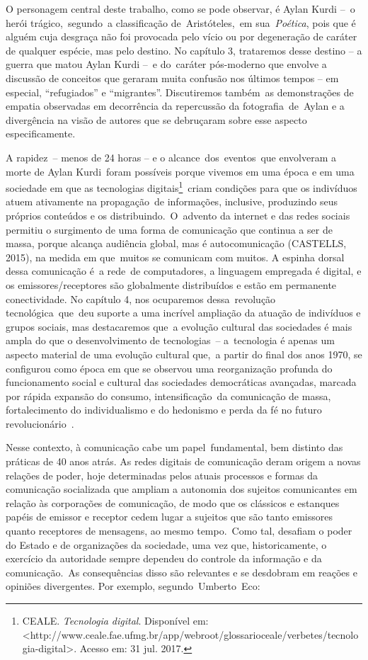 \documentclass[
  letterpaper,
  a4paper,
  12pt]{scrbook}
\begin{document}
O personagem central deste trabalho, como se pode observar, é Aylan
Kurdi --~o herói trágico,~segundo~a classificação de~Aristóteles,~em
sua~\emph{Poética}, pois que é alguém cuja desgraça não foi provocada
pelo vício ou por degeneração de caráter de qualquer espécie, mas pelo
destino. No capítulo 3, trataremos desse destino -- a guerra que matou
Aylan Kurdi --~e do~caráter pós-moderno que envolve a discussão de
conceitos que geraram muita confusão nos últimos tempos -- em especial,
``refugiados'' e ``migrantes''. Discutiremos também~as demonstrações de
empatia observadas em decorrência da repercussão da fotografia~de~Aylan
e a divergência na visão de autores que se debruçaram sobre esse aspecto
especificamente.~

A rapidez~-- menos de 24 horas -- e o alcance~dos~eventos~que envolveram
a morte de Aylan Kurdi~foram possíveis porque vivemos em uma época e em
uma sociedade em que as tecnologias digitais\footnote{CEALE.
  \emph{Tecnologia digital}. Disponível em:
  \textless http://www.ceale.fae.ufmg.br/app/webroot/glossarioceale/verbetes/tecnologia-digital\textgreater.
  Acesso em: 31 jul. 2017.}~criam condições para que os indivíduos atuem
ativamente na propagação~de informações, inclusive, produzindo seus
próprios conteúdos e os distribuindo.~O~advento da internet e das redes
sociais permitiu o surgimento de uma forma de comunicação que continua a
ser de massa, porque alcança audiência global, mas é autocomunicação
(CASTELLS, 2015), na medida em que~muitos se comunicam com muitos. A
espinha dorsal dessa comunicação é~a rede~de computadores, a linguagem
empregada é digital, e os emissores/receptores são globalmente
distribuídos e estão em permanente conectividade. No capítulo 4, nos
ocuparemos dessa~revolução tecnológica~que~deu suporte a uma incrível
ampliação da atuação de indivíduos e grupos sociais, mas destacaremos
que~a evolução cultural das sociedades é mais ampla do que o
desenvolvimento de tecnologias~-- a~tecnologia é apenas um aspecto
material de uma evolução cultural que,~a partir do final dos anos 1970,
se configurou como época em que se observou uma reorganização profunda
do funcionamento social e cultural das sociedades democráticas
avançadas, marcada por rápida expansão do consumo, intensificação~da
comunicação de massa, fortalecimento do individualismo e do hedonismo e
perda da fé no futuro revolucionário~\autocite{lipovetsky2004tempos}.~

Nesse contexto, à comunicação cabe um papel~fundamental, bem distinto
das práticas de 40 anos atrás. As redes digitais de comunicação deram
origem a novas relações de poder, hoje determinadas pelos atuais
processos e formas da comunicação socializada que ampliam a autonomia
dos sujeitos comunicantes em relação às corporações de comunicação, de
modo que os clássicos e estanques papéis de emissor e receptor cedem
lugar a sujeitos que são tanto emissores quanto receptores de mensagens,
ao mesmo tempo.~Como tal, desafiam o poder do Estado e de organizações
da sociedade, uma vez que, historicamente, o exercício da autoridade
sempre dependeu do controle da informação e da comunicação.~As
consequências disso são relevantes e se desdobram em reações e opiniões
divergentes. Por exemplo, segundo~Umberto~Eco:~
\end{document}
